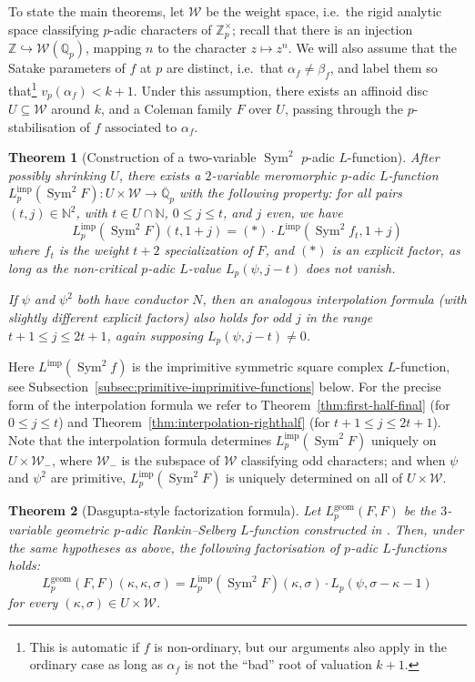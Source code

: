 \documentclass[11pt, a4paper, reqno]{amsart}
\theoremstyle{definition}
\theoremstyle{plain}
\newtheorem{thmintro}{Theorem}
\theoremstyle{remark}
\DeclareMathOperator{\Sym}{Sym}
\newcommand{\numberset}{\mathbb}
\newcommand{\Q}{\numberset{Q}}
\newcommand{\Z}{\numberset{Z}}
\newcommand{\N}{\numberset{N}}
\newcommand{\Weight}{\mathcal{W}}
\newcommand{\Lgeom}{L_p^{\mathrm{geom}}}
\newcommand{\Limp}{L^{\mathrm{imp}}}
\renewcommand{\le}{\leqslant}
\begin{document}
  To state the main theorems, let $\Weight$ be the weight space, i.e.~the rigid analytic space classifying $p$-adic characters of $\Z_p^\times$; recall that there is an injection $\Z \hookrightarrow \Weight(\Q_p)$, mapping $n$ to the character $z\mapsto z^n$. We will also assume that the Satake parameters of $f$ at $p$ are distinct, i.e.\ that $\alpha_f\neq\beta_f$, and label them so that\footnote{This is automatic if $f$ is non-ordinary, but our arguments also apply in the ordinary case as long as $\alpha_f$ is not the ``bad'' root of valuation $k + 1$.} $v_p(\alpha_f) < k + 1$. Under this assumption, there exists an affinoid disc $U\subseteq \Weight$ around $k$, and a Coleman family $F$ over $U$, passing through the $p$-stabilisation of $f$ associated to $\alpha_f$. 
  
  \begin{thmintro}[Construction of a two-variable $\Sym^2$ $p$-adic $L$-function]
   \label{intro:final1}
   After possibly shrinking $U$, there exists a $2$-variable meromorphic $p$-adic $L$-function $\Limp_p(\Sym^2 F)\colon U\times\Weight \to \overline{\Q}_p$ with the following property: for all pairs $(t, j) \in \N^2$, with $t \in U \cap \N$, $0 \le j \le t$, and $j$ even, we have
   \[ \Limp_p(\Sym^2 F)(t, 1+j) = (*) \cdot \Limp(\Sym^2 f_t, 1 + j) \]
   where $f_t$ is the weight $t + 2$ specialization of $F$, and $(*)$ is an explicit factor, as long as the non-critical $p$-adic $L$-value $L_p(\psi, j - t)$ does not vanish. 
   
   If $\psi$ and $\psi^2$ both have conductor $N$, then an analogous interpolation formula (with slightly different explicit factors) also holds for odd $j$ in the range $t+1 \le j \le 2t + 1$, again supposing $L_p(\psi, j - t) \ne 0$.
  \end{thmintro}

  Here $\Limp(\Sym^2 f)$ is the imprimitive symmetric square complex $L$-function, see Subsection~\ref{subsec:primitive-imprimitive-functions} below. For the precise form of the interpolation formula we refer to Theorem~\ref{thm:first-half-final} (for $0 \le j \le t$) and Theorem~\ref{thm:interpolation-righthalf} (for $t + 1 \le j \le 2t + 1$). Note that the interpolation formula determines $\Limp_p(\Sym^2 F)$ uniquely on $U \times \Weight_-$, where $\Weight_-$ is the subspace of $\Weight$ classifying odd characters; and when $\psi$ and $\psi^2$ are primitive, $\Limp_p(\Sym^2 F)$ is uniquely determined on all of $U \times \Weight$.
  
  \begin{thmintro}[Dasgupta-style factorization formula]
   \label{intro:final2}
   Let $\Lgeom(F,F)$ be the $3$-variable geometric $p$-adic Rankin--Selberg $L$-function constructed in \cite{loefflerzerbes16}. Then, under the same hypotheses as above, the following factorisation of $p$-adic $L$-functions holds:
   \[
    \Lgeom(F,F)(\kappa,\kappa,\sigma) = \Limp_p(\Sym^2 F)(\kappa,\sigma) \cdot L_p(\psi, \sigma - \kappa - 1)
   \]
   for every $(\kappa,\sigma)\in U\times\Weight$.
  \end{thmintro}
\end{document}

